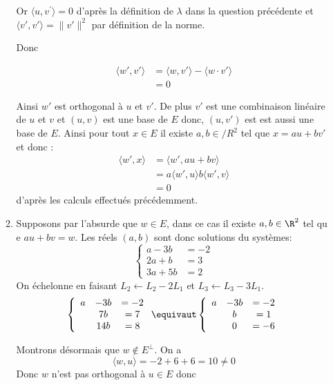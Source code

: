 \documentclass[a4paper, 11pt,reqno]{article}
\begin{document}
\begin{correction}
\begin{enumerate}
\begin{enumerate}
Or $\langle  u , v^{\prime} \rangle= 0$ d'après la définition de $\lambda $ dans la question précédente et $ \langle v' , v' \rangle =\|v'\|^2$ par définition de la norme. 



Donc 

\begin{align*}
\langle w', v' \rangle &= \langle w , v' \rangle - \langle w \cdot v' \rangle \\
&=0
\end{align*}

Ainsi $w'$ est orthogonal à $u$ et $v'$. De plus $v'$  est une combinaison linéaire de $u$ et $v$ et $(u,v)$ est une base de $E$ donc, $(u,v')$ est est aussi une base de $E$. Ainsi pour tout $x\in E$ il existe $a, b\in /R^2$ tel que $x= au +bv'$ et donc :
\begin{align*}
\langle w'  , x \rangle &= \langle w', au +bv\rangle\\
									 &= a\langle w', u\rangle b \langle w' , v\rangle\\
									 &= 0
\end{align*}
d'après les calculs effectués précédemment. 


\item Supposons par l'absurde que $w\in E$, dans ce cas il existe $a, b\in \R^2$ tel qu e
$au +bv =w$. Les réels  $(a,b)$ sont donc solutions du systèmes:
$$\left\{ \begin{array}{cc}
a -3b &=-2\\
2a+b &= 3\\
3a +5b&= 2
\end{array}\right.$$
On échelonne en faisant $L_2\leftarrow L_2 -2L_1$ et $L_3\leftarrow L_3 -3L_1$. 
$$\left\{ \begin{array}{ccc}
a &-3b &=-2\\
&7b &= 7\\
&14b&= 8
\end{array}\right. \equivaut 
\left\{ \begin{array}{ccc}
a &-3b &=-2\\
&b &= 1\\
&0&= -6
\end{array}\right. 
$$



Montrons désormais que $w\notin E^\perp$. On a 
 $$\langle w , u \rangle = -2 +6 +6=10\neq 0$$ 
 Donc $w$ n'est pas orthogonal à $u\in E$ donc 



\end{enumerate}
\end{enumerate}
\end{correction}
\end{document}
